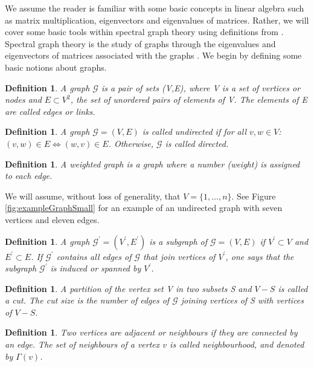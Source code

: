 \documentclass[12pt]{article}
\numberwithin{equation}{section}
\newtheorem{definition}[theorem]{Definition}
\newcommand*\graphvar[1]{\mathcal#1}
\begin{document}
We assume the reader is familiar with some basic concepts in linear algebra such as matrix multiplication, eigenvectors and eigenvalues of matrices. Rather, we will cover some basic tools within spectral graph theory using definitions from \cite{For10,New06a, Spi12, Spi07}. Spectral graph theory is the study of graphs through the eigenvalues and eigenvectors of matrices associated with the graphs \cite{Spi12}. We begin by defining some basic notions about graphs.
\begin{definition}
\label{def:graph}
	A graph $\graphvar{G}$ is a pair of sets (V,E), where V is a set of vertices or nodes and $E \subset V^{2}$, the set of unordered pairs of elements of V. The elements of E are called edges or links.
\end{definition}
\begin{definition}
\label{def:undirectedGraph}
	A graph $\graphvar{G} = (V,E)$ is called undirected if for all $v,w \in V$: $(v,w) \in E \iff (w,v) \in E$. Otherwise, $\graphvar{G}$ is called directed.
\end{definition}
\begin{definition}
\label{def:weightedGraph}
	A weighted graph is a graph where a number (weight) is assigned to each edge.
\end{definition}
We will assume, without loss of generality, that $V = \{1,\dots,n\}$. See Figure \ref{fig:exampleGraphSmall} for an example of an undirected graph with seven vertices and eleven edges.
\begin{definition}
\label{def:subGraph}
	A graph $\graphvar{G}^{\prime} = (V^{\prime},E^{\prime})$ is a subgraph of $\graphvar{G} = (V,E)$ if $V^{\prime} \subset V$ and $E^{\prime} \subset E$. If $\graphvar{G}^{\prime}$ contains all edges of $\graphvar{G}$ that join vertices of $V^{\prime}$, one says that the subgraph $\graphvar{G}^{\prime}$ is induced or spanned by $V^{\prime}$.
\end{definition}
\begin{definition}
\label{def:cuts}
	A partition of the vertex set V in two subsets S and $V-S$ is called a cut. The cut size is the number of edges of $\graphvar{G}$ joining vertices of S with vertices of $V-S$.
\end{definition}
\begin{definition}
\label{def:neighbourhoodNode}
	Two vertices are adjacent or neighbours if they are connected by an edge. The set of neighbours of a vertex $v$ is called neighbourhood, and denoted by $\Gamma(v)$.
\end{definition}
\end{document}
